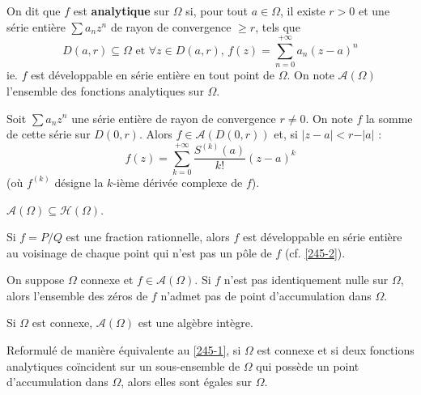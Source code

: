   \begin{definition}
    On dit que $f$ est \textbf{analytique} sur $\Omega$ si, pour tout $a \in \Omega$, il existe $r > 0$ et une série entière $\sum a_n z^n$ de rayon de convergence $\geq r$, tels que
    \[ D(a, r) \subseteq \Omega \text{ et } \forall z \in D(a, r), \, f(z) = \sum_{n=0}^{+\infty} a_n (z-a)^n \]
    ie. $f$ est développable en série entière en tout point de $\Omega$. On note $\mathcal{A}(\Omega)$ l'ensemble des fonctions analytiques sur $\Omega$.
  \end{definition}

  \begin{proposition}
    Soit $\sum a_n z^n$ une série entière de rayon de convergence $r \neq 0$. On note $f$ la somme de cette série sur $D(0,r)$. Alors $f \in \mathcal{A}(D(0, r))$ et, si $\vert z - a \vert < r - \vert a \vert$ :
    \[ f(z) = \sum_{k=0}^{+\infty} \frac{S^{(k)}(a)}{k!} (z-a)^k \]
    (où $f^{(k)}$ désigne la $k$-ième dérivée complexe de $f$).
  \end{proposition}


  \begin{proposition}
    $\mathcal{A}(\Omega) \subseteq \mathcal{H}(\Omega)$.
  \end{proposition}


  \begin{proposition}
    Si $f = P/Q$ est une fraction rationnelle, alors $f$ est développable en série entière au voisinage de chaque point qui n'est pas un pôle de $f$ (cf. \cref{245-2}).
  \end{proposition}


  \begin{theorem}
    \label{245-1}
    On suppose $\Omega$ connexe et $f \in \mathcal{A}(\Omega)$. Si $f$ n'est pas identiquement nulle sur $\Omega$, alors l'ensemble des zéros de $f$ n'admet pas de point d'accumulation dans $\Omega$.
  \end{theorem}


  \begin{corollary}
    Si $\Omega$ est connexe, $\mathcal{A}(\Omega)$ est une algèbre intègre.
  \end{corollary}


  \begin{remark}
    Reformulé de manière équivalente au \cref{245-1}, si $\Omega$ est connexe et si deux fonctions analytiques coïncident sur un sous-ensemble de $\Omega$ qui possède un point d'accumulation dans $\Omega$, alors elles sont égales sur $\Omega$.
  \end{remark}

